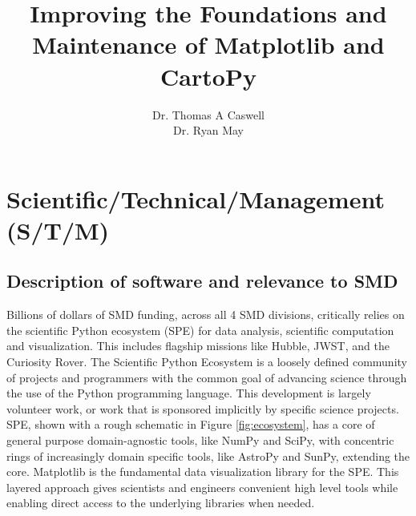 \documentclass[12pt]{article}
\numberwithin{page}{section}
\begin{document}
\title{Improving the Foundations and Maintenance of Matplotlib and CartoPy}
\author{Dr. Thomas A Caswell\\Dr. Ryan May}
\date{}
\maketitle

\setcounter{tocdepth}{2}
\tableofcontents
\thispagestyle{empty}
\newpage

\section{Scientific/Technical/Management (S/T/M)}
\setcounter{page}{1}

\subsection{Description of software and relevance to SMD}

Billions of dollars of SMD funding, across all 4 SMD divisions,
critically relies on the scientific Python ecosystem (SPE) for data
analysis, scientific computation and visualization.  This includes
flagship missions like Hubble, JWST, and the Curiosity Rover.  The
Scientific Python Ecosystem is a loosely defined community of projects
and programmers with the common goal of advancing science through the
use of the Python programming language.  This development is largely
volunteer work, or work that is sponsored implicitly by specific
science projects.  SPE, shown with a rough schematic in Figure
\ref{fig:ecosystem}, has a core of general purpose domain-agnostic
tools, like NumPy\cite{Harris2020} and SciPy\cite{Virtanen2020}, with
concentric rings of increasingly domain specific tools, like
AstroPy\cite{robitaille2013astropy} and
SunPy\cite{sunpy_community2020}, extending the core.
Matplotlib\cite{Hunter:2007} is the fundamental data visualization
library for the SPE. This layered approach gives scientists and
engineers convenient high level tools while enabling direct access to
the underlying libraries when needed.
\end{document}

